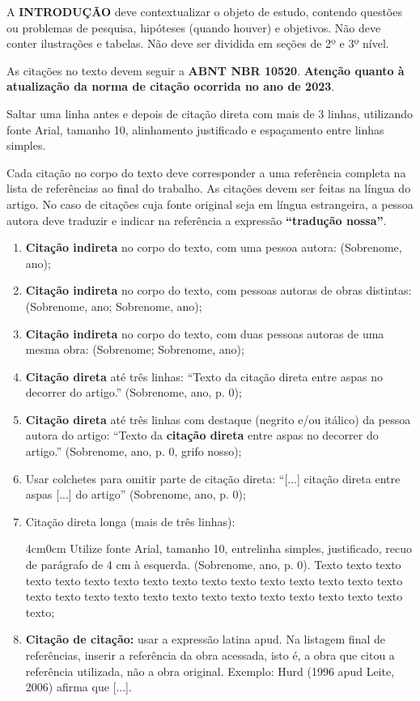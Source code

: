 \documentclass[12pt, a4paper]{article}
\begin{document}
A \textbf{INTRODUÇÃO} deve contextualizar o objeto de estudo, contendo questões ou problemas de pesquisa, hipóteses (quando houver) e objetivos. Não deve conter ilustrações e tabelas. Não deve ser dividida em seções de 2º e 3º nível.

As citações no texto devem seguir a \textbf{ABNT NBR 10520}. \textbf{Atenção quanto à atualização da norma de citação ocorrida no ano de 2023}.

Saltar uma linha antes e depois de citação direta com mais de 3 linhas, utilizando fonte Arial, tamanho 10, alinhamento justificado e espaçamento entre linhas simples.

Cada citação no corpo do texto deve corresponder a uma referência completa na lista de referências ao final do trabalho. As citações devem ser feitas na língua do artigo. No caso de citações cuja fonte original seja em língua estrangeira, a pessoa autora deve traduzir e indicar na referência a expressão \textbf{“tradução nossa”}.

\begin{enumerate}[noitemsep]
\item[a.] \textbf{Citação indireta} no corpo do texto, com uma pessoa autora: (Sobrenome, ano);
\item[b.] \textbf{Citação indireta} no corpo do texto, com pessoas autoras de obras distintas: (Sobrenome, ano; Sobrenome, ano);
\item[c.] \textbf{ Citação indireta} no corpo do texto, com duas pessoas autoras de uma mesma obra: (Sobrenome; Sobrenome, ano);
\item[d.] \textbf{Citação direta} até três linhas: “Texto da citação direta entre aspas no decorrer do artigo.” (Sobrenome, ano, p. 0);
\item[e.] \textbf{Citação direta} até três linhas com destaque (negrito e/ou itálico) da pessoa autora do artigo: “Texto da \textbf{citação direta} entre aspas no decorrer do artigo.” (Sobrenome, ano, p. 0, grifo nosso);
\item[f.] Usar colchetes para omitir parte de citação direta: “[...] citação direta entre aspas [...] do artigo” (Sobrenome, ano, p. 0);
\item[g.] Citação direta longa (mais de três linhas):
    \begin{adjustwidth}{4cm}{0cm}
        \singlespacing \small
        Utilize fonte Arial, tamanho 10, entrelinha simples, justificado, recuo de parágrafo de 4 cm à esquerda. (Sobrenome, ano, p. 0). Texto texto texto texto texto texto texto texto texto texto texto texto texto texto texto texto texto texto texto texto texto texto texto texto texto texto texto texto texto texto;
    \end{adjustwidth}
       
\item[h.] \textbf{Citação de citação:} usar a expressão latina apud. Na listagem final de referências, inserir a referência da obra acessada, isto é, a obra que citou a referência utilizada, não a obra original. Exemplo: Hurd (1996 apud Leite, 2006) afirma que [...].     
\end{enumerate}
\end{document}
